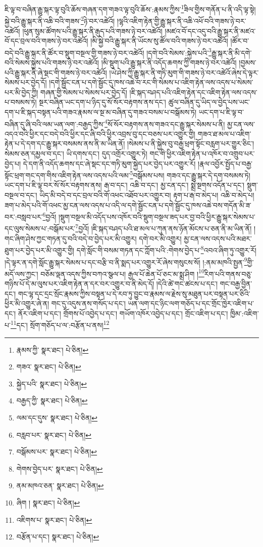 ཇི་ལྟ་བ་བཞིན་རྒྱུ་སྐར་ལྟ་བུའི་ཆོས་གཞན་དག་གཟའ་ལྟ་བུའི་ཆོས་:རྣམས་ཀྱིས་\footnote{རྣམས་ཀྱི་  སྣར་ཐང་།  པེ་ཅིན། }ཟིལ་གྱིས་གནོན་པ་ནི་འདི་ལྟ་སྟེ། སྐྱེ་བའི་རྒྱུ་སྐར་ནི་འཆི་བའི་གཟས་\footnote{གཟའ་  སྣར་ཐང་།  པེ་ཅིན། }ཉེ་བར་འཚེའོ། །ལྷའི་འཇིག་རྟེན་གྱི་རྒྱུ་སྐར་ནི་འཆི་འཕོ་བའི་གཟས་ཉེ་བར་འཚེའོ། །ཕུན་སུམ་ཚོགས་པའི་རྒྱུ་སྐར་ནི་རྒུད་པའི་གཟས་ཉེ་བར་འཚེའོ། །མཛའ་བོ་དང་འདུ་བའི་རྒྱུ་སྐར་ནི་མཛའ་བོ་དང་བྲལ་བའི་གཟས་ཉེ་བར་འཚེའོ། །མི་སྐྱེ་བའི་རྒྱུ་སྐར་ནི་ཡོངས་སུ་ཚོལ་བའི་གཟས་ཉེ་བར་འཚེའོ། །ཚོར་བ་བདེ་བའི་རྒྱུ་སྐར་ནི་ཚོར་བ་སྡུག་བསྔལ་གྱི་གཟས་ཉེ་བར་འཚེའོ། །དགེ་བའི་སེམས་:སྐྱེས་པའི་\footnote{སྐྱེད་པའི་  སྣར་ཐང་།  པེ་ཅིན། }རྒྱུ་སྐར་ནི་མི་དགེ་བའི་སེམས་སྐྱེས་པའི་གཟས་ཉེ་བར་འཚེའོ། །མི་སྡུག་པའི་རྒྱུ་སྐར་ནི་འདོད་ཆགས་ཀྱི་གཟས་ཉེ་བར་འཚེའོ། །བྱམས་པའི་རྒྱུ་སྐར་ནི་ཞེ་སྡང་གི་གཟས་ཉེ་བར་འཚེའོ། །ཡེ་ཤེས་ཀྱི་རྒྱུ་སྐར་ནི་གཏི་མུག་གི་གཟས་ཉེ་བར་འཚེའོ་ཞེས་དེ་ལྟར་སེམས་པར་བྱེད་དོ། །དགེ་སྦྱོང་ངན་པ་དགེ་སྦྱོང་དུ་ཁས་འཆེ་བ་རང་གི་སེམས་པ་འཇིག་རྟེན་ལས་འདས་པ་སེམས་པར་མི་བྱེད་ཀྱི། གཞན་གྱི་སེམས་པ་སེམས་པར་བྱེད་དོ། །ཇི་སྐད་བཤད་པའི་འཇིག་རྟེན་དང་འཇིག་རྟེན་ལས་འདས་པ་བསམས་ཏེ། སྔར་བཞིན་ཡང་དག་པ་ཉིད་དུ་སོ་སོར་བརྟགས་ནས་དང་། ཚུལ་བཞིན་དུ་ཡིད་ལ་བྱེད་པས་ཡང་དག་པ་ཇི་སྐད་བསྟན་པའི་གཟའ་རྣམས་ལ་སྔ་མ་བཞིན་དུ་གཟའ་བསམ་པ་བསྒོམས་ཏེ། ཡང་དག་པ་ཇི་ལྟ་བ་བཞིན་དུ་ཞི་བའི་ལམ་ཡན་ལག་:བརྒྱད་ཀྱིས་\footnote{བརྒྱད་ཀྱི་  སྣར་ཐང་།  པེ་ཅིན། }སོ་སོར་བརྟགས་ནས་གཟའ་དང་རྒྱུ་སྐར་སེམས་པ་ནི། མྱ་ངན་ལས་འདའ་བའི་ཕྱིར་དང་བདེ་བའི་ཕྱིར་དང་ཞི་བའི་ཕྱིར་འབྲས་བུ་དང་བཅས་པར་འགྱུར་གྱི། གཟའ་ཐ་མལ་པ་འཇིག་རྟེན་པ་དེ་དག་དང་རྒྱུ་སྐར་བསམས་ནས་ནི་མ་ཡིན་ནོ། །སེམས་པ་ནི་སྐྱེས་བུ་བརྒྱ་ཕྲག་སྟོང་བརླག་པར་གྱུར་ཅིང་། སེམས་ཅན་དམྱལ་བ་དང་། ཡི་དགས་དང་། དུད་འགྲོར་འགྱུར་ཏེ། གང་གི་ཕྱིར་འཇིག་རྟེན་པ་འཁོར་བ་འགྲུབ་པར་བྱེད་པ། དེ་དག་ནི་འདོད་ཆགས་དང་ཞེ་སྡང་དང་གཏི་མུག་སྐྱེད་པར་བྱེད་པར་འགྱུར་རོ། །རྣལ་འབྱོར་སྤྱོད་པ་བརྒྱ་སྟོང་ཕྲག་གང་དག་གིས་འཇིག་རྟེན་ལས་འདས་པའི་ལམ་\footnote{ལམ་དང་དུས་  སྣར་ཐང་།  པེ་ཅིན། }བསྒོམས་པས། གཟའ་དང་རྒྱུ་སྐར་དེ་དག་བསམས་ཏེ། ཡང་དག་པ་ཇི་ལྟ་བར་སོ་སོར་བརྟགས་ནས། རྒ་བ་དང་། འཆི་བ་དང་། མྱ་ངན་དང་། སྨྲེ་སྔགས་འདོན་པ་དང་། སྡུག་བསྔལ་བ་དང་། ཡིད་མི་བདེ་བ་དང་བྲལ་བའི་གོ་འཕང་འཐོབ་པར་འགྱུར་བ། རྟག་པ་རྒ་བ་མེད་པ། འཆི་བ་མེད་པ། ཟག་པ་མེད་པའི་གོ་འཕང་མྱ་ངན་ལས་འདས་པ་འདི་ལ་དགེ་སྦྱོང་ངན་པ་དགེ་སྦྱོང་དུ་ཁས་འཆེ་བས་གདོན་མི་ཟ་བར་:བསླབ་པར་\footnote{བརླབ་པར་  སྣར་ཐང་།  པེ་ཅིན། }བྱའོ། །སྡུག་བསྔལ་མི་འདོད་པས་འཁོར་བའི་སྡུག་བསྔལ་ཟད་པར་བྱ་བའི་ཕྱིར་རྒྱུ་སྐར་སེམས་པ་དང་ལུས་སེམས་པ་:བསྒོམ་པར་\footnote{བསྒོམས་པར་  སྣར་ཐང་།  པེ་ཅིན། }བྱའོ། །ཇི་སྐད་བཤད་པའི་ཐ་མལ་པ་ཀུན་ནས་ཉོན་མོངས་པ་ཅན་ནི་མ་ཡིན་ནོ། །གང་ཞིག་ཤེས་ཀྱང་གཏན་དུ་བའི་བདེ་བ་བྱེད་པར་མི་འགྱུར། དགེ་བར་མི་འགྱུར། མྱ་ངན་ལས་འདས་པའི་མཐར་ཐུག་པར་བྱེད་པར་མི་འགྱུར་གྱི། དགེ་སློང་གི་བསམ་གཏན་དང་ཀློག་པའི་:གེགས་བྱེད་པ་\footnote{གེགས་བྱེད་པར་  སྣར་ཐང་།  པེ་ཅིན། }འབའ་ཞིག་ཏུ་འགྱུར་རོ། །དེ་ལྟར་ན་དགེ་སློང་རྒྱུ་སྐར་སེམས་པ་དང་བརྩི་བ་ནི་སྨད་པར་འགྱུར་རོ་ཞེས་གསུངས་སོ། །:ནམ་མཁའི་སྤྱན་\footnote{ནམ་མཁའ་ཅན་  སྣར་ཐང་།  པེ་ཅིན། }གྱི་མདོ་ལས་ཀྱང་། བཅོམ་ལྡན་འདས་ཀྱིས་བཀའ་སྩལ་པ། རྒྱལ་པོ་ཆེན་པོ་ཅང་མ་སྨྲ་ཤིག །\footnote{ཞིག །  སྣར་ཐང་།  པེ་ཅིན། }རིག་པའི་གནས་བཅུ་གཉིས་པོ་དེ་མ་ལུས་པར་འཇིག་རྟེན་ན་དར་བར་འགྱུར་བ་ནི་མེད་དོ། །དེའི་ཚེ་གང་ཚངས་པ་དང་། གང་བརྒྱ་བྱིན་དང་། གང་ལྷ་དང་དྲང་སྲོང་རྣམས་ཀྱིས་བསྟན་པ་དེ་རབ་ཏུ་བྱུང་བ་རྣམས་ལ་རྗེས་སུ་མཐུན་པར་བསྟན་པར་ཅིའི་ཕྱིར་མི་འགྱུར་ཞེ་ན། གང་དུ་འདུས་ནས་གསོད་པ་དང་། ཡན་ལག་དང་ཉིང་ལག་གཅོད་པ་དང་གྲོང་ཁྱེར་འཇིག་པ་དང་། ནོར་འཇིག་པ་དང་། གྲོགས་པོ་འབྱེད་པ་དང་། གཡོག་འཁོར་འབྱེད་པ་དང་། གྲོང་འཇིག་པ་དང་། ཁྱིམ་:འཇིག་པ་\footnote{འཇིགས་པ་  སྣར་ཐང་།  པེ་ཅིན། }དང་། སྲོག་གཅོད་པ་ལ་:བརྩོན་པ་ནས།\footnote{བརྩོན་པ་དང་།  སྣར་ཐང་།  པེ་ཅིན། } 